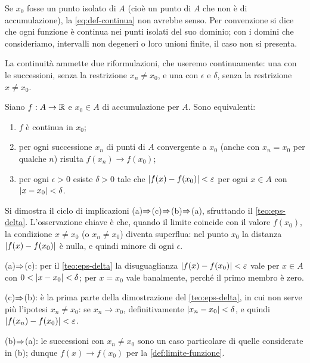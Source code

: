 \begin{osservazione}
Se $x_{0}$ fosse un punto isolato di $A$ (cioè un punto di $A$ che non è di
accumulazione), la \eqref{eq:def-continua} non avrebbe senso. Per convenzione si dice
che ogni funzione è continua nei punti isolati del suo dominio; con i domini che
consideriamo, intervalli non degeneri o loro unioni finite, il caso non si presenta.
\end{osservazione}

La continuità ammette due riformulazioni, che useremo continuamente: una con le
successioni, senza la restrizione $x_{n}\neq x_{0}$, e una con $\epsilon$ e $\delta$,
senza la restrizione $x\neq x_{0}$.

\begin{proposizione}\label{prop:caratt-continuita}
Siano $f:A\to\mathbb{R}$ e $x_{0}\in A$ di accumulazione per $A$. Sono equivalenti:
\begin{enumerate}[label=\textup{(\alph*)}]
  \item $f$ è continua in $x_{0}$;
  \item per ogni successione $x_{n}$ di punti di $A$ convergente a $x_{0}$ (anche con
  $x_{n}=x_{0}$ per qualche $n$) risulta $f(x_{n})\to f(x_{0})$;
  \item per ogni $\epsilon>0$ esiste $\delta>0$ tale che $\lvert f(x)-f(x_{0})\rvert<\varepsilon$ per
  ogni $x\in A$ con $\lvert x-x_{0}\rvert<\delta$.
\end{enumerate}
\end{proposizione}

\begin{schema}
\end{schema}

\begin{strategia}
Si dimostra il ciclo di implicazioni (a)$\Rightarrow$(c)$\Rightarrow$(b)$\Rightarrow$(a), sfruttando
il \cref{teo:eps-delta}. L'osservazione chiave è che, quando il limite coincide con il
valore $f(x_{0})$, la condizione $x\neq x_{0}$ (o $x_{n}\neq x_{0}$) diventa superflua:
nel punto $x_{0}$ la distanza $\lvert f(x)-f(x_{0})\rvert$ è nulla, e quindi minore di ogni
$\epsilon$.
\end{strategia}

\begin{dimostrazione}
(a)$\Rightarrow$(c): per il \cref{teo:eps-delta} la disuguaglianza
$\lvert f(x)-f(x_{0})\rvert<\varepsilon$ vale per $x\in A$ con $0<\lvert x-x_{0}\rvert<\delta$; per
$x=x_{0}$ vale banalmente, perché il primo membro è zero.

(c)$\Rightarrow$(b): è la prima parte della dimostrazione del \cref{teo:eps-delta}, in cui
non serve più l'ipotesi $x_{n}\neq x_{0}$: se $x_{n}\to x_{0}$, definitivamente
$\lvert x_{n}-x_{0}\rvert<\delta$, e quindi $\lvert f(x_{n})-f(x_{0})\rvert<\varepsilon$.

(b)$\Rightarrow$(a): le successioni con $x_{n}\neq x_{0}$ sono un caso particolare di quelle
considerate in (b); dunque $f(x)\to f(x_{0})$ per la \cref{def:limite-funzione}.
\end{dimostrazione}

